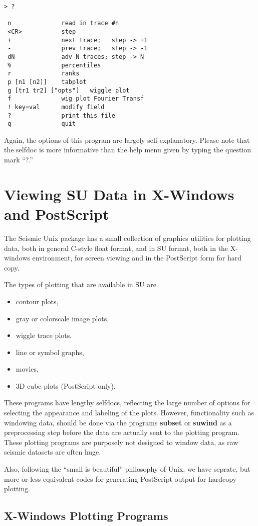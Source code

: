 {{{{\begin{verbatim}
> ?

 n              read in trace #n
 <CR>           step
 +              next trace;   step -> +1
 -              prev trace;   step -> -1
 dN             adv N traces; step -> N
 %              percentiles
 r              ranks
 p [n1 [n2]]    tabplot
 g [tr1 tr2] ["opts"]   wiggle plot
 f              wig plot Fourier Transf
 ! key=val      modify field
 ?              print this file
 q              quit   
\end{verbatim}}\noindent
Again, the options of this program are largely self-explanatory.
Please note that the selfdoc is more informative than the help
menu given by typing the question mark ``?.''

\chapter{Viewing SU Data in X-Windows and PostScript}

The Seismic Unix package has a small collection of graphics utilities
for plotting data, both in general C-style float format, and in
SU format, both in the X-windows environment, for screen viewing
and in the PostScript form for hard copy.

The types of plotting that are available in SU are
\begin{itemize}
\item contour plots,
\item gray or colorscale image plots,
\item wiggle trace plots,
\item line or symbol graphs,
\item movies,
\item 3D cube plots (PostScript only).
\end{itemize}

These programs have lengthy selfdocs, reflecting the large number
of options for selecting the appearance and labeling of the plots.
However, functionality such as windowing data, should be done via
the programs {\bf subset\/} or {\bf suwind\/} as a preprocessing step
before the data are actually sent to the plotting program.
These plotting programs are purposely not designed to window data,
as raw seismic datasets are often huge.

Also, following the ``small is beautiful'' philosophy of Unix,
we have seprate, but more or less equivalent codes for generating
PostScript output for hardcopy plotting.

\section{X-Windows Plotting Programs}

}}}
